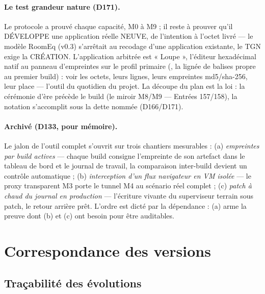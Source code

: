 \paragraph{Le test grandeur nature (D171).} Le protocole a prouvé chaque capacité,
M0 à M9 ; il reste à prouver qu'il DÉVELOPPE une application réelle NEUVE, de
l'intention à l'octet livré — le modèle RoomEq (v0.3) s'arrêtait au recodage d'une
application existante, le TGN exige la CRÉATION. L'application arbitrée est
« Loupe », l'éditeur hexadécimal natif au panneau d'empreintes sur le profil
primaire (, la lignée de balises propre  au
premier build) : voir les octets, leurs lignes, leurs empreintes md5/sha-256, leur
place — l'outil du quotidien du projet. La découpe du plan est la loi : la cérémonie
d'ère précède le build (le miroir M8/M9 — Entrées 157/158), la notation s'accomplit
sous la dette nommée (D166/D171).

\paragraph{Archivé (D133, pour mémoire).} Le jalon de l'outil complet s'ouvrit sur trois
chantiers mesurables : (a) \emph{empreintes par build actives} — chaque build consigne
l'empreinte de son artefact dans le tableau de bord et le journal de travail, la
comparaison inter-build devient un contrôle automatique ; (b) \emph{interception d'un
flux navigateur en VM isolée} — le proxy transparent M3 porte le tunnel M4 au scénario
réel complet ; (c) \emph{patch à chaud du journal en production} — l'écriture vivante
du superviseur terrain sous patch, le retour arrière prêt. L'ordre est dicté par la
dépendance : (a) arme la preuve dont (b) et (c) ont besoin pour être auditables.

\section{Correspondance des versions}\label{sec:correspondance}

\subsection{Traçabilité des évolutions}\label{sec:evolutions}

